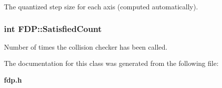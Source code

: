 The quantized step size for each axis (computed automatically).

\subsubsection{\setlength{\rightskip}{0pt plus 5cm}int FDP::Satisfied\-Count}\label{class_FDP_m0}


Number of times the collision checker has been called.



The documentation for this class was generated from the following file:\begin{CompactItemize}
\item 
{\bf fdp.h}\end{CompactItemize}
